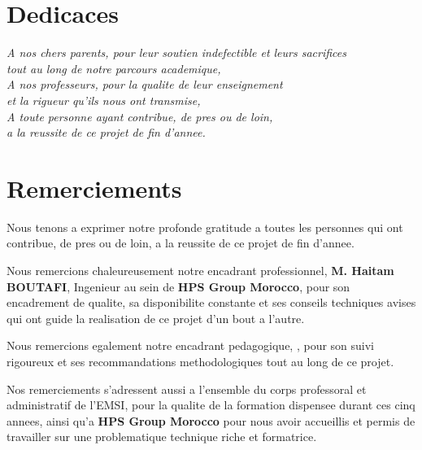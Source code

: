 
\chapter*{Dedicaces}

\vspace{2cm}
\begin{flushright}
\textit{
A nos chers parents, pour leur soutien indefectible et leurs sacrifices\\
tout au long de notre parcours academique,\\[0.4cm]
A nos professeurs, pour la qualite de leur enseignement\\
et la rigueur qu'ils nous ont transmise,\\[0.4cm]
A toute personne ayant contribue, de pres ou de loin,\\
a la reussite de ce projet de fin d'annee.
}
\end{flushright}

\newpage

\chapter*{Remerciements}

Nous tenons a exprimer notre profonde gratitude a toutes les personnes qui ont contribue,
de pres ou de loin, a la reussite de ce projet de fin d'annee.

Nous remercions chaleureusement notre encadrant professionnel, \textbf{M. Haitam BOUTAFI},
Ingenieur au sein de \textbf{HPS Group Morocco}, pour son encadrement de qualite, sa
disponibilite constante et ses conseils techniques avises qui ont guide la realisation
de ce projet d'un bout a l'autre.

Nous remercions egalement notre encadrant pedagogique, ,
pour son suivi rigoureux et ses recommandations methodologiques tout au long de ce projet.

Nos remerciements s'adressent aussi a l'ensemble du corps professoral et administratif
de l'EMSI, pour la qualite de la formation dispensee durant ces cinq annees, ainsi qu'a
\textbf{HPS Group Morocco} pour nous avoir accueillis et permis de travailler sur une
problematique technique riche et formatrice.

